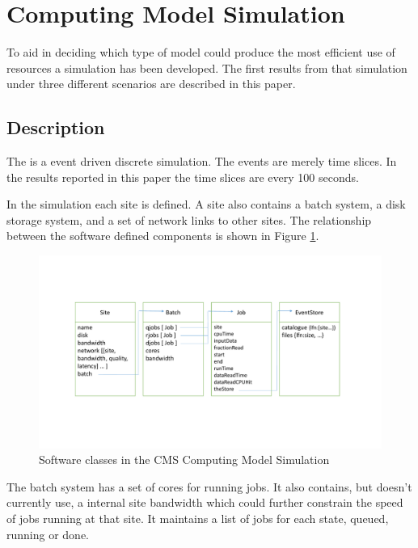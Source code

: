 \documentclass[a4paper]{jpconf}
\begin{document}
\section{Computing Model Simulation}

To aid in deciding which type of model could produce the most
efficient use of resources a simulation has been developed. The first
results from that simulation under three different scenarios are
described in this paper.

\subsection{Description}

The 
is a event driven discrete simulation. The events are merely time
slices. In the results reported in this paper the time slices are
every 100 seconds.

In the simulation each site is defined. A site also contains a batch
system, a disk storage system, and a set of network links to other
sites. The relationship between the software defined components is
shown in Figure \ref{fig:classDiag}.

\begin{figure}
  \includegraphics[trim=100 140 100 130, clip, width=\textwidth]{figures/classDiag.pdf}
  \caption{Software classes in the CMS Computing Model
    Simulation\label{fig:classDiag}}
\end{figure}

The batch system has a set of cores for running jobs. It also
contains, but doesn't currently use, a internal site bandwidth which
could further constrain the speed of jobs running at that site. It
maintains a list of jobs for each state, queued, running or done.
\end{document}
